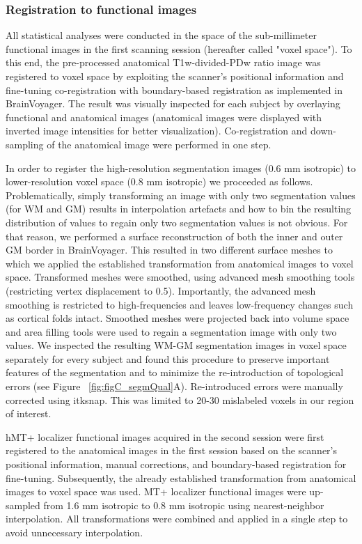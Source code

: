 \subsubsection{Registration to functional images}
All statistical analyses were conducted in the space of the sub-millimeter functional images in the first scanning session (hereafter called "voxel space"). To this end, the pre-processed anatomical T1w-divided-PDw ratio image was registered to voxel space by exploiting the scanner’s positional information and fine-tuning co-registration with boundary-based registration \parencite{Greve2009} as implemented in BrainVoyager. The result was visually inspected for each subject by overlaying functional and anatomical images (anatomical images were displayed with inverted image intensities for better visualization). Co-registration and down-sampling of the anatomical image were performed in one step.

In order to register the high-resolution segmentation images (0.6 mm isotropic) to lower-resolution voxel space (0.8 mm isotropic) we proceeded as follows. Problematically, simply transforming an image with only two segmentation values (for WM and GM) results in interpolation artefacts and how to bin the resulting distribution of values to regain only two segmentation values is not obvious. For that reason, we performed a surface reconstruction of both the inner and outer GM border in BrainVoyager. This resulted in two different surface meshes to which we applied the established transformation from anatomical images to voxel space. Transformed meshes were smoothed, using advanced mesh smoothing tools (restricting vertex displacement to 0.5). Importantly, the advanced mesh smoothing is restricted to high-frequencies and leaves low-frequency changes such as cortical folds intact. Smoothed meshes were projected back into volume space and area filling tools were used to regain a segmentation image with only two values. We inspected the resulting WM-GM segmentation images in voxel space separately for every subject and found this procedure to preserve important features of the segmentation and to minimize the re-introduction of topological errors (see Figure ~\ref{fig:figC_segmQual}A). Re-introduced errors were manually corrected using itksnap. This was limited to 20-30 mislabeled voxels in our region of interest.

hMT+ localizer functional images acquired in the second session were first registered to the anatomical images in the first session based on the scanner’s positional information, manual corrections, and boundary-based registration \parencite{Greve2009} for fine-tuning. Subsequently, the already established transformation from anatomical images to voxel space was used. MT+ localizer functional images were up-sampled from 1.6 mm isotropic to 0.8 mm isotropic using nearest-neighbor interpolation. All transformations were combined and applied in a single step to avoid unnecessary interpolation.

